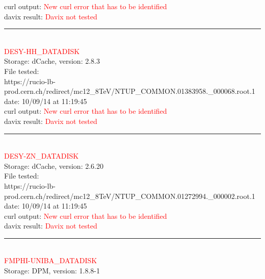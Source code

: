 curl output:  \textcolor{red}{New curl error that has to be identified}\\

davix result:  \textcolor{red}{Davix not tested}\\

\rule{\textwidth}{1pt}\\

\textcolor{red}{\normalsize{DESY-HH\_DATADISK}}\\

Storage: dCache, version: 2.8.3\\

File tested:\\
\footnotesize{https://rucio-lb-prod.cern.ch/redirect/mc12\_8TeV/NTUP\_COMMON.01383958.\_000068.root.1}\\

date: 10/09/14 at 11:19:45\\

curl output:  \textcolor{red}{New curl error that has to be identified}\\

davix result:  \textcolor{red}{Davix not tested}\\

\rule{\textwidth}{1pt}\\

\textcolor{red}{\normalsize{DESY-ZN\_DATADISK}}\\

Storage: dCache, version: 2.6.20\\

File tested:\\
\footnotesize{https://rucio-lb-prod.cern.ch/redirect/mc12\_8TeV/NTUP\_COMMON.01272994.\_000002.root.1}\\

date: 10/09/14 at 11:19:45\\

curl output:  \textcolor{red}{New curl error that has to be identified}\\

davix result:  \textcolor{red}{Davix not tested}\\

\rule{\textwidth}{1pt}\\

\textcolor{red}{\normalsize{FMPHI-UNIBA\_DATADISK}}\\

Storage: DPM, version: 1.8.8-1\\

